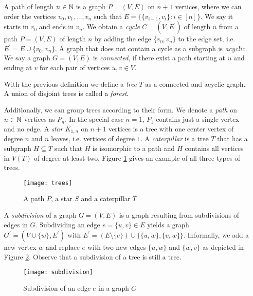 A path of length $n\in\mathbb{N}$ is a graph $P=(V,E)$ on $n+1$ vertices, where we can order the vertices $v_0, v_1, \dots ,v_n$ such that $E=\lbrace\lbrace v_{i-1},v_i\rbrace : i\in [n]\rbrace$. We say it starts in $v_0$ and ends in $v_n$. We obtain a \textit{cycle} $C=(V,E^\prime)$ of length $n$ from a path $P=(V,E)$ of length $n$ by adding the edge $\lbrace v_0,v_n\rbrace$ to the edge set, i.e. $E^\prime = E\cup\lbrace v_0,v_n\rbrace$. A graph that does not contain a cycle as a subgraph is \textit{acyclic}. We say a graph $G=(V,E)$ is \textit{connected}, if there exist a path starting at $u$ and ending at $v$ for each pair of vertices $u,v\in V$.

With the previous definition we define a \textit{tree} $T$ as a connected and acyclic graph. A union of disjoint trees is called a \textit{forest}.

Additionally, we can group trees according to their form. We denote a \textit{path} on $n\in\mathbb{N}$ vertices as $P_n$. In the special case $n=1$, $P_1$ contains just a single vertex and no edge. A \textit{star} $K_{1,n}$ on $n+1$ vertices is a tree with one center vertex of degree $n$ and $n$ leaves, i.e. vertices of degree $1$. A \textit{caterpillar} is a tree $T$ that has a subgraph $H\subseteq T$ such that $H$ is isomorphic to a path and $H$ contains all vertices in $V(T)$ of degree at least two.  %
Figure \ref{f3ba} gives an example of all three types of trees.

\begin{figure}[ht]
\begin{center}
\texttt{[image: trees]}
\end{center}
\caption{A path $P$, a star $S$ and a caterpillar $T$}
\label{f3ba}
\end{figure}

A \textit{subdivision} of a graph $G=(V,E)$ is a graph resulting from subdivisions of edges in $G$. Subdividing an edge $e=\lbrace u,v\rbrace\in E$ yields a graph $G^\prime =(V\cup \lbrace w\rbrace, E^\prime )$ with $E^\prime =(E\setminus \lbrace e\rbrace ) \cup \lbrace \lbrace u,w\rbrace, \lbrace v,w \rbrace\rbrace$. Informally, we add a new vertex $w$ and replace $e$ with two new edges $\lbrace u,w\rbrace$ and $\lbrace w,v\rbrace$ as depicted in Figure \ref{f2ba}. Observe that a subdivision of a tree is still a tree.\\

\begin{figure}[ht]
\begin{center}
\texttt{[image: subdivision]}
\end{center}
\caption{Subdivision of an edge $e$ in a graph $G$}
\label{f2ba}
\end{figure}


